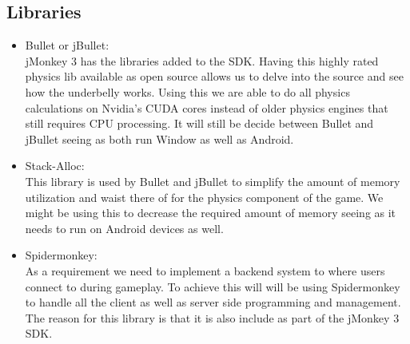 \documentclass[letterpaper]{article}
\begin{document}
			\vspace{0.1cm}
			
			\subsection*{Libraries}
			
			\vspace{0.1cm}
			
			\begin{itemize}
				\item Bullet or jBullet: \\
					jMonkey 3 has the libraries added to the SDK. Having this highly rated physics lib available as open source allows us to delve into the source and see how the underbelly works. Using this we are able to do all physics calculations on Nvidia's CUDA cores instead of older physics engines that still requires CPU processing. It will still be decide between Bullet and jBullet seeing as both run Window as well as Android.
					
				\item Stack-Alloc: \\
					This library is used by Bullet and jBullet to simplify the amount of memory utilization and waist there of for the physics component of the game. We might be using this to decrease the required amount of memory seeing as it needs to run on Android devices as well.
				
				\item Spidermonkey:\\
					As a requirement we need to implement a backend system to where users connect to during gameplay. To achieve this will will be using Spidermonkey to handle all the client as well as server side programming and management. The reason for this library is that it is also include as part of the jMonkey 3 SDK.
					

\end{itemize}
\end{document}

